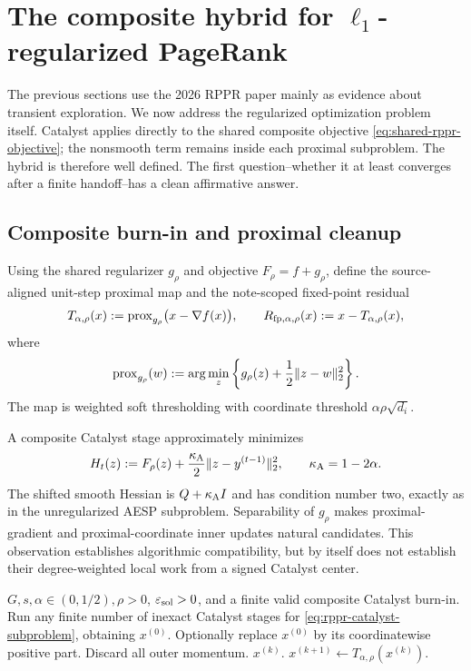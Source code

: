 \section{The composite hybrid for $\ell_1$-regularized PageRank}
\label{sec:composite-hybrid}

The previous sections use the 2026 RPPR paper mainly as evidence about
transient exploration.  We now address the regularized optimization problem
itself.  Catalyst applies directly to the shared composite objective
\cref{eq:shared-rppr-objective}; the nonsmooth term remains inside each
proximal subproblem.
The hybrid is therefore well defined.  The first question--whether it at least
converges after a finite handoff--has a clean affirmative answer.

\subsection{Composite burn-in and proximal cleanup}

Using the shared regularizer $g_\rho$ and objective $F_\rho=f+g_\rho$, define
the source-aligned unit-step proximal map and the note-scoped fixed-point
residual
\begin{equation}
  T_{\alpha,\rho}(x)
  :=\operatorname{prox}_{g_\rho}\bigl(x-\nabla f(x)\bigr),
  \qquad
  R_{\mathrm{fp},\alpha,\rho}(x):=x-T_{\alpha,\rho}(x),
  \label{eq:rppr-prox-map}
\end{equation}
where
\[
  \operatorname{prox}_{g_\rho}(w)
  :=\arg\min_z\left\{g_\rho(z)+\frac12\lVert z-w\rVert_2^2\right\}.
\]
The map is weighted soft thresholding with coordinate threshold
$\alpha\rho\sqrt{d_i}$.

A composite Catalyst stage approximately minimizes
\begin{equation}
  H_t(z)
  :=F_\rho(z)+\frac{\kappa_{\rm A}}2\lVert z-y^{(t-1)}\rVert_2^2,
  \qquad \kappa_{\rm A}=1-2\alpha.
  \label{eq:rppr-catalyst-subproblem}
\end{equation}
The shifted smooth Hessian is $Q+\kappa_{\rm A}I$ and has condition number two,
exactly as in the unregularized AESP subproblem.  Separability of $g_\rho$ makes
proximal-gradient and proximal-coordinate inner updates natural candidates.
This observation establishes algorithmic compatibility, but by itself does
not establish their degree-weighted local work from a signed Catalyst center.

\begin{algorithm}[t]
\caption{Proof-oriented composite hybrid for RPPR}
\label{alg:rppr-hybrid}
\begin{algorithmic}[1]
\REQUIRE $G,s,\alpha\in(0,1/2),\rho>0$, $\varepsilon_{\mathrm{sol}}>0$, and a finite valid
         composite Catalyst burn-in.
\STATE Run any finite number of inexact Catalyst stages for
       \cref{eq:rppr-catalyst-subproblem}, obtaining $x^{(0)}$.
\STATE Optionally replace $x^{(0)}$ by its coordinatewise positive part.
\STATE Discard all outer momentum.
    \RETURN $x^{(k)}$.
  \ENDIF
  \STATE $x^{(k+1)}\leftarrow T_{\alpha,\rho}(x^{(k)})$.
\ENDFOR
\end{algorithmic}
\end{algorithm}

